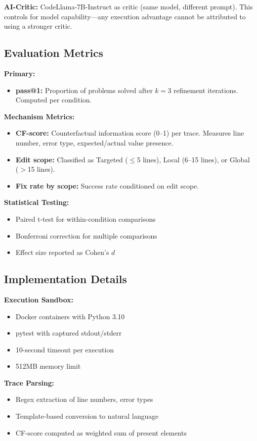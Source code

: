 \textbf{AI-Critic:} CodeLlama-7B-Instruct as critic (same model, different prompt). This controls for model capability---any execution advantage cannot be attributed to using a stronger critic.

\subsection{Evaluation Metrics}

\textbf{Primary:}
\begin{itemize}
\item \textbf{pass@1:} Proportion of problems solved after $k=3$ refinement iterations. Computed per condition.
\end{itemize}

\textbf{Mechanism Metrics:}
\begin{itemize}
\item \textbf{CF-score:} Counterfactual information score (0--1) per trace. Measures line number, error type, expected/actual value presence.
\item \textbf{Edit scope:} Classified as Targeted ($\leq$5 lines), Local (6--15 lines), or Global ($>$15 lines).
\item \textbf{Fix rate by scope:} Success rate conditioned on edit scope.
\end{itemize}

\textbf{Statistical Testing:}
\begin{itemize}
\item Paired t-test for within-condition comparisons
\item Bonferroni correction for multiple comparisons
\item Effect size reported as Cohen's $d$
\end{itemize}

\subsection{Implementation Details}

\textbf{Execution Sandbox:}
\begin{itemize}
\item Docker containers with Python 3.10
\item pytest with captured stdout/stderr
\item 10-second timeout per execution
\item 512MB memory limit
\end{itemize}

\textbf{Trace Parsing:}
\begin{itemize}
\item Regex extraction of line numbers, error types
\item Template-based conversion to natural language
\item CF-score computed as weighted sum of present elements
\end{itemize}

